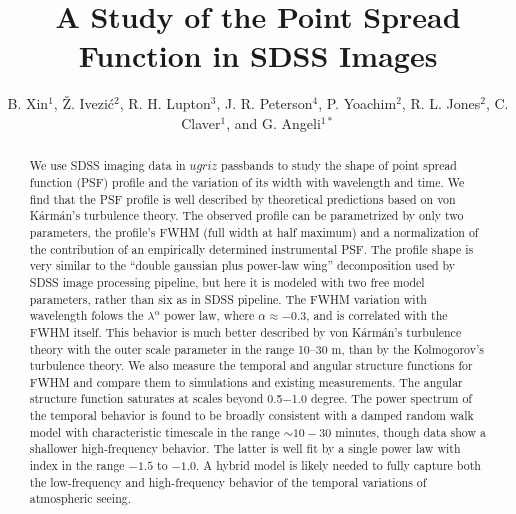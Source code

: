 \documentclass[12pt,preprint]{aastex}
\newcommand{\vk}{von K\'{a}rm\'{a}n}
\begin{document}
\title{A Study of the Point Spread Function in SDSS Images}    %

\author{B. Xin$^1$, \v{Z}. Ivezi\'{c}$^2$, R. H. Lupton$^3$,  J. R. Peterson$^4$, P. Yoachim$^2$, 
R. L. Jones$^2$, C. Claver$^1$, and G. Angeli$^{1*}$}


\begin{abstract}
We use SDSS imaging data in $ugriz$ passbands to study the shape of
point spread function (PSF) profile and the variation of its width with 
wavelength and time. We find that the PSF profile is well described by 
theoretical predictions based on \vk's turbulence theory. The observed 
profile can be parametrized by only two parameters, the profile's FWHM (full width
at half maximum) and a normalization of the contribution of an empirically determined 
instrumental PSF. The profile shape is very similar to the ``double gaussian
plus power-law wing'' decomposition used by SDSS image processing pipeline, 
but here it is modeled with two free model parameters, rather than six as in SDSS pipeline. 
The FWHM variation with wavelength folows the
$\lambda^{\alpha}$ power law, where $\alpha \approx-0.3$, and is correlated
with the FWHM itself. This behavior is much better described by \vk's turbulence 
theory with the outer scale parameter in the range 10--30 m, than by the 
Kolmogorov's turbulence theory. We also measure the temporal and angular
structure functions for FWHM and compare them to simulations and
existing measurements. The angular structure function saturates at scales beyond 0.5$-$1.0 degree. 
The power spectrum of the temporal behavior is found to be broadly consistent with 
a damped random walk model with characteristic timescale in the range $\sim10-30$ minutes, 
though data show a shallower high-frequency behavior. The latter is well fit 
by a single power law with index in the range $-1.5$ to $-1.0$. A hybrid model 
is likely needed to fully capture both the low-frequency and high-frequency 
behavior of the temporal variations of atmospheric seeing. 
\end{abstract}
\end{document}
